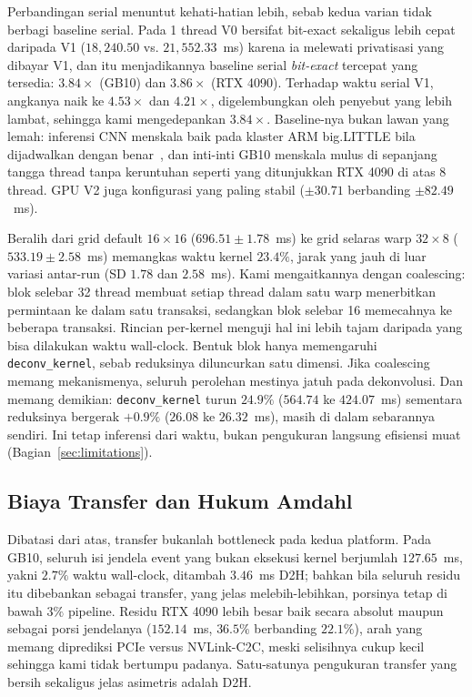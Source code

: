 \documentclass[conference]{IEEEtran}
\begin{document}
Perbandingan serial menuntut kehati-hatian lebih, sebab kedua varian tidak berbagi baseline serial. Pada 1 thread V0 bersifat bit-exact sekaligus lebih cepat daripada V1 ($18{,}240.50$ vs. $21{,}552.33$~ms) karena ia melewati privatisasi yang dibayar V1, dan itu menjadikannya baseline serial \emph{bit-exact} tercepat yang tersedia: $3.84\times$ (GB10) dan $3.86\times$ (RTX 4090). Terhadap waktu serial V1, angkanya naik ke $4.53\times$ dan $4.21\times$, digelembungkan oleh penyebut yang lebih lambat, sehingga kami mengedepankan $3.84\times$. Baseline-nya bukan lawan yang lemah: inferensi CNN menskala baik pada klaster ARM big.LITTLE bila dijadwalkan dengan benar~\cite{wang2020pipeit}, dan inti-inti GB10 menskala mulus di sepanjang tangga thread tanpa keruntuhan seperti yang ditunjukkan RTX 4090 di atas 8 thread. GPU V2 juga konfigurasi yang paling stabil ($\pm30.71$ berbanding $\pm82.49$~ms).

Beralih dari grid default $16{\times}16$ ($696.51 \pm 1.78$~ms) ke grid selaras warp $32{\times}8$ ($533.19 \pm 2.58$~ms) memangkas waktu kernel $23.4\%$, jarak yang jauh di luar variasi antar-run (SD $1.78$ dan $2.58$~ms). Kami mengaitkannya dengan coalescing: blok selebar 32 thread membuat setiap thread dalam satu warp menerbitkan permintaan ke dalam satu transaksi, sedangkan blok selebar 16 memecahnya ke beberapa transaksi. Rincian per-kernel menguji hal ini lebih tajam daripada yang bisa dilakukan waktu wall-clock. Bentuk blok hanya memengaruhi \texttt{deconv\_kernel}, sebab reduksinya diluncurkan satu dimensi. Jika coalescing memang mekanismenya, seluruh perolehan mestinya jatuh pada dekonvolusi. Dan memang demikian: \texttt{deconv\_kernel} turun $24.9\%$ ($564.74$ ke $424.07$~ms) sementara reduksinya bergerak $+0.9\%$ ($26.08$ ke $26.32$~ms), masih di dalam sebarannya sendiri. Ini tetap inferensi dari waktu, bukan pengukuran langsung efisiensi muat (Bagian~\ref{sec:limitations}).

\subsection{Biaya Transfer dan Hukum Amdahl}
\label{sec:nvlink}
Dibatasi dari atas, transfer bukanlah bottleneck pada kedua platform. Pada GB10, seluruh isi jendela event yang bukan eksekusi kernel berjumlah $127.65$~ms, yakni $2.7\%$ waktu wall-clock, ditambah $3.46$~ms D2H; bahkan bila seluruh residu itu dibebankan sebagai transfer, yang jelas melebih-lebihkan, porsinya tetap di bawah $3\%$ pipeline. Residu RTX 4090 lebih besar baik secara absolut maupun sebagai porsi jendelanya ($152.14$~ms, $36.5\%$ berbanding $22.1\%$), arah yang memang diprediksi PCIe versus NVLink-C2C, meski selisihnya cukup kecil sehingga kami tidak bertumpu padanya. Satu-satunya pengukuran transfer yang bersih sekaligus jelas asimetris adalah D2H.
\end{document}
